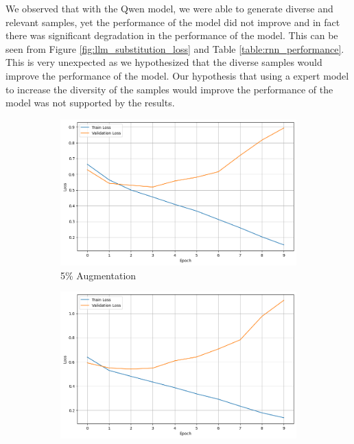 \documentclass{article}
\begin{document}
We observed that with the Qwen model, we were able to generate diverse and
relevant samples, yet the performance of the model did not improve and in fact
there was significant degradation in the performance of the model. This can be
seen from Figure \ref{fig:llm_substitution_loss} and Table
\ref{table:rnn_performance}. This is very unexpected as we hypothesized that
the diverse samples would improve the performance of the model. Our hypothesis
that using a expert model to increase the diversity of the samples would
improve the performance of the model was not supported by the results.

\begin{figure}[ht]
  \centering
  \begin{subfigure}[b]{0.3\textwidth}
    \includegraphics[width=\textwidth]{img/llm_loss_5.png}
    \caption{5\% Augmentation}
    \label{fig:llm_loss_5}
  \end{subfigure}
  \hfill
  \begin{subfigure}[b]{0.3\textwidth}
    \includegraphics[width=\textwidth]{img/llm_loss_10.png}

\end{subfigure}
\end{figure}
\end{document}
